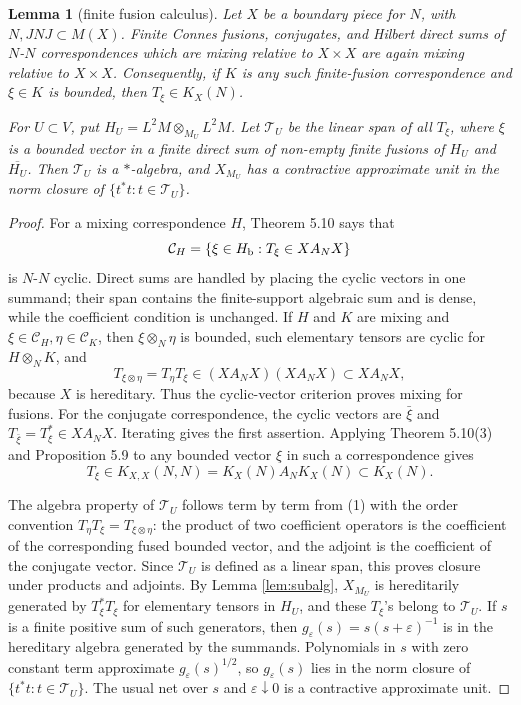\documentclass[12pt]{article}
\newtheorem{lemma}{Lemma}
\newcommand{\cT}{\mathcal T}
\begin{document}
\begin{lemma}[finite fusion calculus]\label{lem:fusion}
Let \(X\) be a boundary piece for \(N\), with \(N,JNJ\subset M(X)\).  Finite
Connes fusions, conjugates, and Hilbert direct sums of \(N\)-\(N\)
correspondences which are mixing relative to \(X\times X\) are again mixing
relative to \(X\times X\).  Consequently, if \(K\) is any such finite-fusion
correspondence and \(\xi\in K\) is bounded, then \(T_\xi\in K_X(N)\).

For \(U\subset V\), put \(H_U=L^2M\otimes_{M_U}L^2M\).  Let \(\cT_U\) be the
linear span of all \(T_\xi\), where \(\xi\) is a bounded vector in a finite
direct sum of non-empty finite fusions of \(H_U\) and \(\overline{H_U}\).
Then \(\cT_U\) is a \(*\)-algebra, and \(X_{M_U}\) has a contractive
approximate unit in the norm closure of \(\{t^*t:t\in\cT_U\}\).
\end{lemma}

\begin{proof}
For a mixing correspondence \(H\), Theorem 5.10 says that
\[
  \mathcal C_H=\{\xi\in H_{\rm b}: T_\xi\in X A_N X\}
\]
is \(N\)-\(N\) cyclic.  Direct sums are handled by placing the cyclic vectors
in one summand; their span contains the finite-support algebraic sum and is
dense, while the coefficient condition is unchanged.  If \(H\) and \(K\) are
mixing and \(\xi\in\mathcal C_H,\eta\in\mathcal C_K\), then \(\xi\otimes_N\eta\)
is bounded, such elementary tensors are cyclic for \(H\otimes_NK\), and
\[
        T_{\xi\otimes\eta}=T_\eta T_\xi\in (X A_N X)(X A_N X)\subset X A_N X,
\]
because \(X\) is hereditary.  Thus the cyclic-vector criterion proves mixing
for fusions.  For the conjugate correspondence, the cyclic vectors are
\(\bar\xi\) and \(T_{\bar\xi}=T_\xi^*\in X A_NX\).  Iterating gives the first
assertion.  Applying Theorem 5.10(3) and Proposition 5.9 to any bounded vector
\(\xi\) in such a correspondence gives
\[
        T_\xi\in K_{X,X}(N,N)=K_X(N)A_NK_X(N)\subset K_X(N).
\]

The algebra property of \(\cT_U\) follows term by term from (1) with the order
convention \(T_\eta T_\xi=T_{\xi\otimes\eta}\): the product of two coefficient
operators is the coefficient of the corresponding fused bounded vector, and the
adjoint is the coefficient of the conjugate vector.  Since \(\cT_U\) is defined
as a linear span, this proves closure under products and adjoints.  By Lemma
\ref{lem:subalg}, \(X_{M_U}\) is hereditarily generated
by \(T_\xi^*T_\xi\) for elementary tensors in \(H_U\), and these \(T_\xi\)'s
belong to \(\cT_U\).  If \(s\) is a finite positive sum of such generators,
then \(g_\varepsilon(s)=s(s+\varepsilon)^{-1}\) is in the hereditary algebra
generated by the summands.  Polynomials in \(s\) with zero constant term
approximate \(g_\varepsilon(s)^{1/2}\), so \(g_\varepsilon(s)\) lies in the
norm closure of \(\{t^*t:t\in\cT_U\}\).  The usual net over \(s\) and
\(\varepsilon\downarrow0\) is a contractive approximate unit.
\end{proof}
\end{document}
